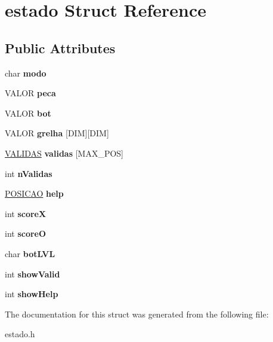 \hypertarget{structestado}{}\section{estado Struct Reference}
\label{structestado}
\subsection*{Public Attributes}
\begin{DoxyCompactItemize}
\item 
\mbox{\label{structestado_a09fed37abd7d04094bfdbb5c0c97e9bc}} 
char {\bfseries modo}
\item 
\mbox{\label{structestado_aa67173516d3e69f71354fb8874af5d64}} 
V\+A\+L\+OR {\bfseries peca}
\item 
\mbox{\label{structestado_a5d4fd17240cc6a3e5b4a2eef1a7532fd}} 
V\+A\+L\+OR {\bfseries bot}
\item 
\mbox{\label{structestado_a2f60057cac98441998f938b80ae6f342}} 
V\+A\+L\+OR {\bfseries grelha} \mbox{[}D\+IM\mbox{]}\mbox{[}D\+IM\mbox{]}
\item 
\mbox{\label{structestado_a925c6a56743d34ed7ef8a7af68d61e1b}} 
\mbox{\hyperlink{structvirar}{V\+A\+L\+I\+D\+AS}} {\bfseries validas} \mbox{[}M\+A\+X\+\_\+\+P\+OS\mbox{]}
\item 
\mbox{\label{structestado_af81281b8de466996d1dc6ca501a865b0}} 
int {\bfseries n\+Validas}
\item 
\mbox{\label{structestado_a7bfb7269d441db231e14c7310c000828}} 
\mbox{\hyperlink{structposicao}{P\+O\+S\+I\+C\+AO}} {\bfseries help}
\item 
\mbox{\label{structestado_aa081db0aa6c64f7968dc89b72790b711}} 
int {\bfseries scoreX}
\item 
\mbox{\label{structestado_a42f27e315b7199d867b69983432f228b}} 
int {\bfseries scoreO}
\item 
\mbox{\label{structestado_a5e14a8efd9392c9fbcfb7bec1b0f8a9c}} 
char {\bfseries bot\+L\+VL}
\item 
\mbox{\label{structestado_a24fc9446b3ee006d03b81c6bebe444d2}} 
int {\bfseries show\+Valid}
\item 
\mbox{\label{structestado_a81f4ff6892566a87d5b5c6cf1208c41a}} 
int {\bfseries show\+Help}
\end{DoxyCompactItemize}


The documentation for this struct was generated from the following file\+:\begin{DoxyCompactItemize}
\item 
estado.\+h\end{DoxyCompactItemize}
